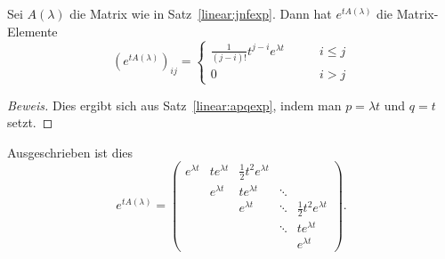 \begin{satz}
\label{linear:alambdaexp}
Sei $A(\lambda)$ die Matrix wie in Satz~\ref{linear:jnfexp}.
Dann hat $e^{tA(\lambda)}$ die Matrix-Elemente
\[
(e^{tA(\lambda)})_{ij}
=
\begin{cases}
\frac1{(j-i)!}t^{j-i}e^{\lambda t}
 &\qquad i\le j\\
0&\qquad i>j
\end{cases}
\]
\end{satz}

\begin{proof}[Beweis]
Dies ergibt sich aus Satz~\ref{linear:apqexp}, indem man $p=\lambda t$ und
$q=t$ setzt.
\end{proof}

Ausgeschrieben ist dies
\[
e^{tA(\lambda)}
=
\begin{pmatrix}
e^{\lambda t}&te^{\lambda t}&\frac12t^2e^{\lambda t}&      & \\
             & e^{\lambda t}&te^{\lambda t}         &\ddots& \\
             &              &e^{\lambda t}          &\ddots&\frac12t^2e^{\lambda t}\\
             &              &                       &\ddots&te^{\lambda t}\\
             &              &                       &      &e^{\lambda t}
\end{pmatrix}.
\]

